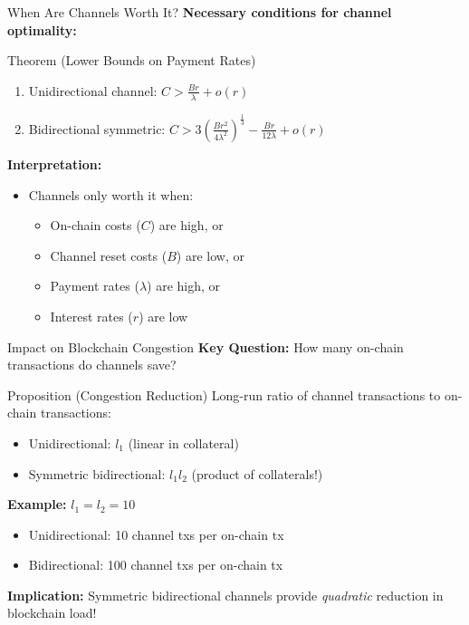 \documentclass[aspectratio=169,12pt]{beamer}
\begin{document}
\begin{frame}{When Are Channels Worth It?}
\textbf{Necessary conditions for channel optimality:}

\begin{block}{Theorem (Lower Bounds on Payment Rates)}
\begin{enumerate}
    \item Unidirectional channel: $C > \frac{Br}{\lambda} + o(r)$
    \item Bidirectional symmetric: $C > 3(\frac{Br^2}{4\lambda^2})^\frac{1}{3} - \frac{Br}{12\lambda} + o(r)$
\end{enumerate}
\end{block}

\textbf{Interpretation:}
\begin{itemize}
    \item Channels only worth it when:
    \begin{itemize}
        \item On-chain costs ($C$) are high, or
        \item Channel reset costs ($B$) are low, or
        \item Payment rates ($\lambda$) are high, or
        \item Interest rates ($r$) are low
    \end{itemize}
\end{itemize}
\end{frame}

\begin{frame}{Impact on Blockchain Congestion}
\textbf{Key Question:} How many on-chain transactions do channels save?

\begin{block}{Proposition (Congestion Reduction)}
Long-run ratio of channel transactions to on-chain transactions:
\begin{itemize}
    \item Unidirectional: $l_1$ (linear in collateral)
    \item Symmetric bidirectional: $l_1 l_2$ (product of collaterals!)
\end{itemize}
\end{block}

\textbf{Example:} $l_1 = l_2 = 10$
\begin{itemize}
    \item Unidirectional: 10 channel txs per on-chain tx
    \item Bidirectional: 100 channel txs per on-chain tx
\end{itemize}

\vspace{0.3cm}
\textbf{Implication:} Symmetric bidirectional channels provide \textit{quadratic} reduction in blockchain load!
\end{frame}
\end{document}
